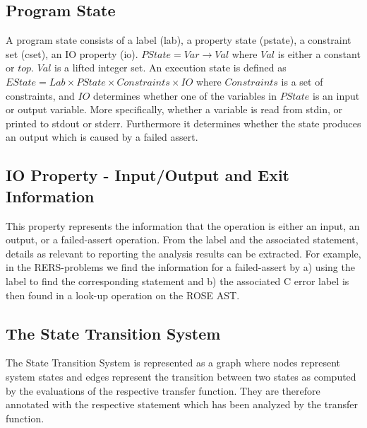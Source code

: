 \documentclass[natbib]{article}
\newcommand{\ignore}[1]{}
\begin{document}
\subsection{Program State}

A program state consists of a label (lab), a property state (pstate),
a constraint set (cset), an IO property (io). $PState = Var
\rightarrow Val$ where $Val$ is either a constant or $top$. $Val$ is a
lifted integer set. An execution state is defined as $EState = Lab \times
PState \times Constraints \times IO$ where $Constraints$ is a set of
constraints, and $IO$ determines whether one of the variables in $PState$ is
an input or output variable. More specifically, whether a variable is
read from stdin, or printed to stdout or stderr. Furthermore it
determines whether the state produces an output which is caused by a
failed assert.

\ignore{
Hence, the analysis information is represented as:

\begin{itemize}
\item Label: num
\item PState: VarId $\rightarrow$ Val
\item SState: Label $\times$ PStateId $\times$ ConstraintId $\times$ IOId
\end{itemize}
}

\subsection{IO Property - Input/Output and Exit Information}

This property represents the information that the operation is either
an input, an output, or a failed-assert operation. From the label and
the associated statement, details as relevant to reporting the
analysis results can be extracted. For example, in the RERS-problems
we find the information for a failed-assert by a) using the label to
find the corresponding statement and b) the associated C error label
is then found in a look-up operation on the ROSE AST.

\subsection{The State Transition System}

\newcommand{\deqop}[0]{\#\#}
\newcommand{\eq}[0]{=}

The State Transition System is represented as a graph where nodes
represent system states and edges represent the transition between two
states as computed by the evaluations of the respective transfer
function. They are therefore annotated with the respective statement
which has been analyzed by the transfer function.



\end{document}
